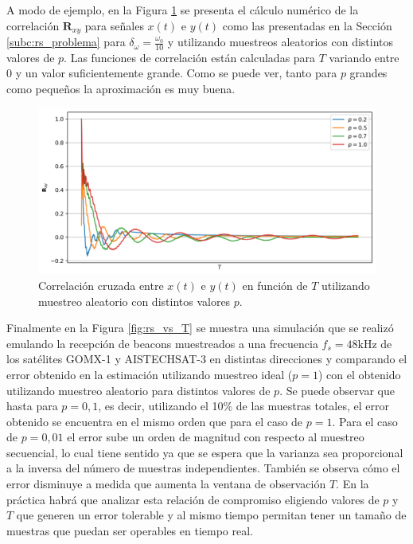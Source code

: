 A modo de ejemplo, en la Figura \ref{fig:rs_rxy} se presenta el cálculo numérico de la correlación $\mathbf{R}_{xy}$ para señales $x(t)$ e $y(t)$ como las presentadas en la Sección \ref{subc:rs_problema} para $\delta_\omega = \frac{\omega_0}{10}$ y utilizando muestreos aleatorios con distintos valores de $p$. Las funciones de correlación están calculadas para $T$ variando entre 0 y un valor suficientemente grande. Como se puede ver, tanto para $p$ grandes como pequeños la aproximación es muy buena.

\begin{figure}[ht!]
    \centering
    \includegraphics[width=0.9\linewidth]{images/04-Random Sampling/rs_rxy.png}
    \caption{Correlación cruzada entre $x(t)$ e $y(t)$ en función de $T$ utilizando muestreo aleatorio con distintos valores $p$.}
    \label{fig:rs_rxy}
\end{figure}

Finalmente en la Figura \ref{fig:rs_vs_T} se muestra una simulación que se realizó emulando la recepción de beacons muestreados a una frecuencia $f_s=48 \mathrm{ kHz}$ de los satélites GOMX-1 y AISTECHSAT-3 en distintas direcciones y comparando el error obtenido en la estimación utilizando muestreo ideal ($p=1$) con el obtenido utilizando muestreo aleatorio para distintos valores de $p$. Se puede observar que hasta para $p=0,1$, es decir, utilizando el 10\% de las muestras totales, el error obtenido se encuentra en el mismo orden que para el caso de $p=1$. Para el caso de $p=0,01$ el error sube un orden de magnitud con respecto al muestreo secuencial, lo cual tiene sentido ya que se espera que la varianza sea proporcional a la inversa del número de muestras independientes. También se observa cómo el error disminuye a medida que aumenta la ventana de observación $T$. En la práctica habrá que analizar esta relación de compromiso eligiendo valores de $p$ y $T$ que generen un error tolerable y al mismo tiempo permitan tener un tamaño de muestras que puedan ser operables en tiempo real.

